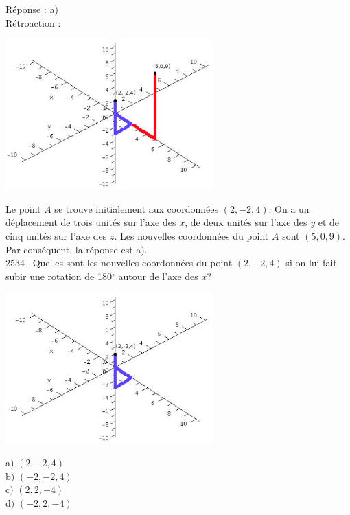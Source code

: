 \documentclass[letterpaper, 12pt]{article}
\begin{document}
R\'eponse : a)\\

R\'etroaction :\\
\begin{center}
 \includegraphics[width=8cm,bb=14 14 594 444]{Q2533r.eps}
\end{center}
Le point $A$ se trouve initialement aux coordonn\'ees $(2, -2, 4)$. On a un d\'eplacement de trois unit\'es sur l'axe des $x$, de deux unit\'es sur l'axe des $y$ et de cinq unit\'es sur l'axe des $z$. Les nouvelles coordonn\'ees du point $A$ sont $(5, 0, 9)$.\\
Par cons\'equent, la r\'eponse est a).\\

2534-- Quelles sont les nouvelles coordonn\'ees du point $(2, -2, 4)$ si on lui fait subir une rotation de 180$^{\circ}$ autour de l'axe des $x$? \\
\begin{center}
 \includegraphics[width=8cm,bb=14 14 594 444]{Q2533q.eps}
\end{center}
a$)$ $(2, -2, 4)$\\
b$)$ $(-2, -2, 4)$\\
c$)$ $(2, 2, -4)$\\
d$)$ $(-2, 2, -4)$\\
\end{document}
